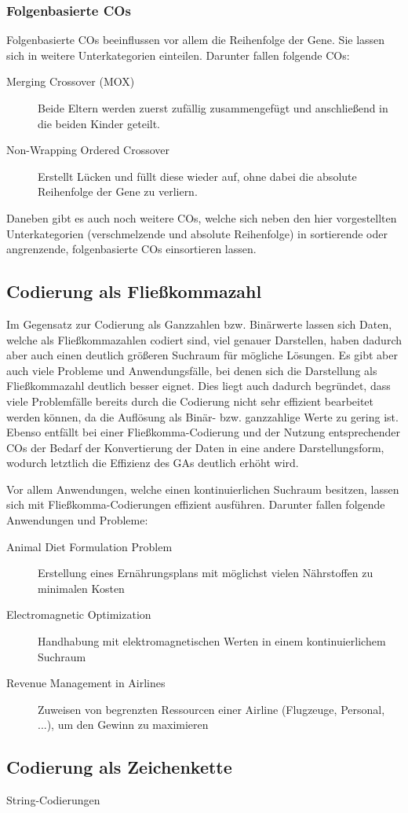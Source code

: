 	\subsubsection{Folgenbasierte COs}
	
		Folgenbasierte COs beeinflussen vor allem die Reihenfolge der Gene. Sie lassen sich in weitere Unterkategorien einteilen. Darunter fallen \uA folgende COs:
		
		\begin{description}
			\item[Merging Crossover (MOX)] Beide Eltern werden zuerst zufällig zusammengefügt und anschließend in die beiden Kinder geteilt.\cite{OrderBasedForGCP}
			\item[Non-Wrapping Ordered Crossover] Erstellt Lücken und füllt diese wieder auf, ohne dabei die absolute Reihenfolge der Gene zu verliern.\cite{GAforTSP}
		\end{description}
	
		Daneben gibt es auch noch weitere COs, welche sich neben den hier vorgestellten Unterkategorien (verschmelzende und absolute Reihenfolge) \zB in sortierende oder angrenzende, folgenbasierte COs einsortieren lassen.


\subsection{Codierung als Fließkommazahl}
\label{sec:FloatCod}

	Im Gegensatz zur Codierung als Ganzzahlen bzw. Binärwerte lassen sich Daten, welche als Fließkommazahlen codiert sind, viel genauer Darstellen, haben dadurch aber auch einen deutlich größeren Suchraum für mögliche Lösungen. Es gibt aber auch viele Probleme und Anwendungsfälle, bei denen sich die Darstellung als Fließkommazahl deutlich besser eignet. Dies liegt auch dadurch begründet, dass viele Problemfälle bereits durch die Codierung nicht sehr effizient bearbeitet werden können, da die Auflösung als Binär- bzw. ganzzahlige Werte zu gering ist. Ebenso entfällt bei einer Fließkomma-Codierung und der Nutzung entsprechender COs der Bedarf der Konvertierung der Daten in eine andere Darstellungsform, wodurch letztlich die Effizienz des GAs deutlich erhöht wird. %
	
	Vor allem Anwendungen, welche einen kontinuierlichen Suchraum besitzen, lassen sich mit Fließkomma-Codierungen effizient ausführen. Darunter fallen \zB folgende Anwendungen und Probleme:
	
	\begin{description}
		\item[Animal Diet Formulation Problem] Erstellung eines Ernährungsplans mit möglichst vielen Nährstoffen zu minimalen Kosten
		\item[Electromagnetic Optimization] Handhabung mit elektromagnetischen Werten in einem kontinuierlichem Suchraum
		\item[Revenue Management in Airlines] Zuweisen von begrenzten Ressourcen einer Airline (Flugzeuge, Personal, ...), um den Gewinn zu maximieren
	\end{description}

\subsection{Codierung als Zeichenkette}
\label{sec:StrCod}

	String-Codierungen

